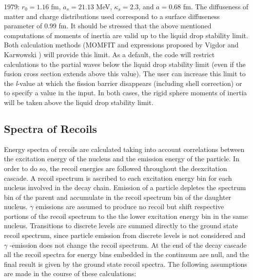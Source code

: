 1979: $r_{0}=1.16$ fm, $a_{s}=21.13$ MeV, $\kappa_{s}=2.3$, and $a=0.68$ fm.
The diffuseness of matter and charge distributions used correspond to a
surface diffuseness parameter of 0.99 fm. It should be stressed that the
above mentioned computations of moments of inertia are valid up to the
liquid drop stability limit. Both calculation methods (MOMFIT and
expressions proposed by Vigdor and Karwowski \cite{VK}) will provide this
limit. As a default, the code will restrict calculations to the partial
waves below the liquid drop stability limit (even if the fusion cross
section extends above this value). The user can increase this limit to the 
\emph{l}-value at which the fission barrier disappears (including shell
correction) or to specify a value in the input. In both cases, the rigid
sphere moments of inertia will be taken above the liquid drop stability
limit.

\subsection{Spectra of Recoils}

Energy spectra of recoils are calculated taking into account correlations
between the excitation energy of the nucleus and the emission energy of the
particle. In order to do so, the recoil energies are followed throughout the
deexcitation cascade. A recoil spectrum is ascribed to each excitation
energy bin for each nucleus involved in the decay chain. Emission of a
particle depletes the spectrum bin of the parent and accumulate in the
recoil spectrum bin of the daughter nucleus. $\gamma$ emissions are assumed
to produce no recoil but shift respective portions of the recoil spectrum to
the the lower excitation energy bin in the same nucleus. Transitions to
discrete levels are summed directly to the ground state recoil spectrum,
since particle emission from discrete levels is not considered and $\gamma$%
-emission does not change the recoil spectrum. At the end of the decay
cascade all the recoil spectra for energy bins embedded in the continuum are
null, and the final result is given by the ground state recoil spectra. The
following assumptions are made in the course of these calculations:

